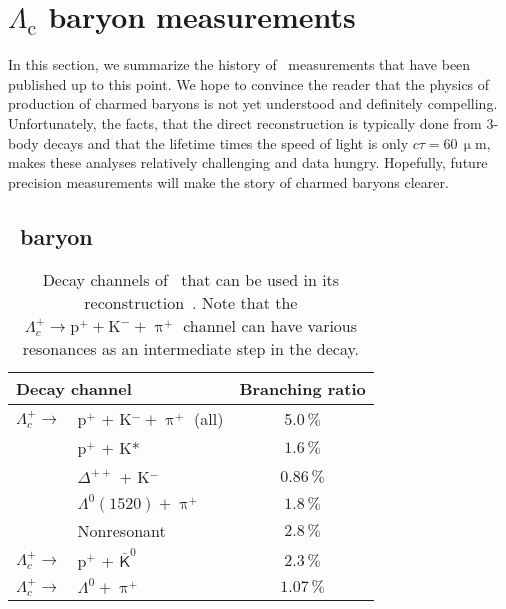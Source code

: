 \section{$\Lambda_\mathrm{c}$ baryon measurements}
In this section, we summarize the history of \Lambdac\ measurements that have been published up to this point. We hope to convince the reader that the physics of production of charmed baryons is not yet understood and definitely compelling. Unfortunately, the facts, that the direct reconstruction is typically done from 3-body decays and that the lifetime times the speed of light is only $c\tau = 60\,\upmu$m, makes these analyses relatively challenging and data hungry. Hopefully, future precision measurements will make the story of charmed baryons clearer.

\subsection{\Lambdac\ baryon}

\begin{table}[htb]
\caption[Decay channels of \Lambdac\ that can be used in its reconstruction.]{\label{tab:lcDecayCahnnels}Decay channels of \Lambdac\ that can be used in its reconstruction~\cite{PDG}. Note that the $\Lambda_c^+ \rightarrow \mathrm{p}^+ + \mathrm{K}^- + \uppi^+$ channel can have various resonances as an intermediate step in the decay.}
\begin{center}
\begin{tabular}{llc}
\toprule
\multicolumn{2}{l}{Decay channel} & Branching ratio  \\
\midrule
$\Lambda_c^+ \rightarrow$ &  p$^+$ + K$^- + \uppi^+$ (all) & 5.0$\,\%$ \\
  & p$^+$ + K* & $1.6\,\%$ \\
  & $\Delta^{++}$ + K$^-$ & $0.86\,\%$ \\
  & $\Lambda^0(1520) + \uppi^+$ & $1.8\,\%$ \\
  & Nonresonant & $2.8\,\%$ \\
$\Lambda_c^+ \rightarrow$ &  p$^+$ + $\overline{\mathsf{K}}^0$ & $2.3\,\% $ \\
$\Lambda_c^+ \rightarrow$ & $ \Lambda^0 + \uppi^+$ & $1.07\,\%$ \\
\bottomrule
\end{tabular}
\end{center}
\end{table}


